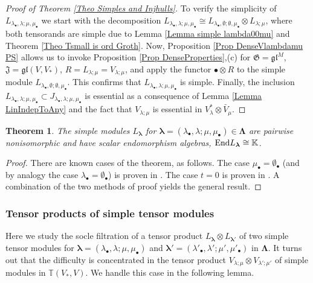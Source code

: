 \documentclass[12pt]{article}
\def\KK {{\mathbb K}}     %
\def\TT {{\mathbb T}}     %
\def\mk {\mathfrak}
\newtheorem{theorem}{Theorem}[section]
\begin{document}
\begin{proof}[Proof of Theorem \ref{Theo Simples and Injhulls}]
To verify the simplicity of $L_{\lambda_\bullet,\lambda;\mu,\mu_\bullet}$ we start with the decomposition $L_{\lambda_\bullet,\lambda;\mu,\mu_\bullet}\cong L_{\lambda_\bullet,\emptyset;\emptyset,\mu_\bullet}\otimes L_{\lambda;\mu}$, where both tensorands are simple due to Lemma \ref{Lemma simple lambda00mu} and Theorem \ref{Theo Tsmall is ord Groth}. Now, Proposition \ref{Prop DenseVlambdamu PS} allows us to invoke Proposition \ref{Prop DenseProperties},(c) for $\mk G=\mk{gl}^M$, $\mk J=\mk{gl}(V,V_*)$, $R=L_{\lambda;\mu}=V_{\lambda;\mu}$, and apply the functor $\bullet\otimes R$ to the simple module $L_{\lambda_\bullet,\emptyset;\emptyset,\mu_\bullet}$. This confirms that $L_{\lambda_\bullet,\lambda;\mu,\mu_\bullet}$ is simple. Finally, the inclusion $L_{\lambda_\bullet,\lambda;\mu,\mu_\bullet}\subset J_{\lambda_\bullet,\lambda;\mu,\mu_\bullet}$ is essential as a consequence of Lemma \ref{Lemma LinIndepToAny} and the fact that $V_{\lambda;\mu}$ is essential in $V^*_{\lambda}\otimes \bar V_{\mu}$.
\end{proof}


\begin{theorem}\label{Theo EndoSimpl}
The simple modules $L_{\bm\lambda}$ for $\bm\lambda=(\lambda_\bullet,\lambda;\mu,\mu_\bullet)\in\bm\Lambda$ are pairwise nonisomorphic and have scalar endomorphism algebras, ${\rm End}L_{\bm\lambda}\cong\KK$.
\end{theorem}

\begin{proof}
There are known cases of the theorem, as follows. The case $\mu_\bullet=\emptyset_\bullet$ (and by analogy the case $\lambda_\bullet=\emptyset_\bullet$) is proven in \cite[Proposition~4.2]{Chirvasitu-Penkov-RC}. The case $t=0$ is proven in \cite[Theorem~3.6]{Chirvasitu-Penkov-UTC}. A combination of the two methods of proof yields the general result.
\end{proof}


\subsubsection{Tensor products of simple tensor modules}

Here we study the socle filtration of a tensor product $L_{\bm\lambda}\otimes L_{\bm\lambda'}$ of two simple tensor modules for $\bm\lambda=(\lambda_\bullet,\lambda;\mu,\mu_\bullet)$ and $\bm\lambda'=(\lambda'_\bullet,\lambda';\mu',\mu'_\bullet)$ in $\bm\Lambda$. It turns out that the difficulty is concentrated in the tensor product $V_{\lambda;\mu}\otimes V_{\lambda';\mu'}$ of simple modules in $\TT(V_*,V)$. We handle this case in the following lemma.
\end{document}
